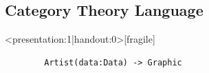 \documentclass[xcolor={dvipsnames}, handout]{beamer}
\begin{document}
\begin{frame}
{\begin{alertblock}{}
\begin{description}
        \end{description}    
    \end{alertblock}
    }
\end{frame}

\subsection{Category Theory Language}
\begin{frame}<presentation:1|handout:0>[fragile]{}
    \begin{verbatim}
        Artist(data:Data) -> Graphic
    \end{verbatim}
\end{frame}
\end{document}
